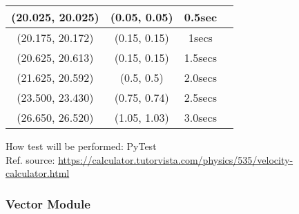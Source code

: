 \documentclass[12pt, titlepage]{article}
\begin{document}
\begin{enumerate}
\begin{table} [h!]
\begin{tabular}{|c|c|c|c}
	\hline(20.025, 20.025)& (0.05, 0.05)& 0.5sec \\ \hline
		
    (20.175, 20.172)& (0.15, 0.15)& 1secs \\ \hline
		
	(20.625, 20.613)& (0.15, 0.15)& 1.5secs \\ \hline
		
    (21.625, 20.592)& (0.5, 0.5)& 2.0secs \\ \hline
		
	(23.500, 23.430)& (0.75, 0.74)& 2.5secs \\ \hline
	
	(26.650, 26.520)& (1.05, 1.03)& 3.0secs \\ \hline
		
	\end{tabular}
	
	
\end{table}
How test will be performed: PyTest\\

Ref. source: \url{https://calculator.tutorvista.com/physics/535/velocity-calculator.html}


\end{enumerate}

\subsubsection{Vector Module}
\end{document}
